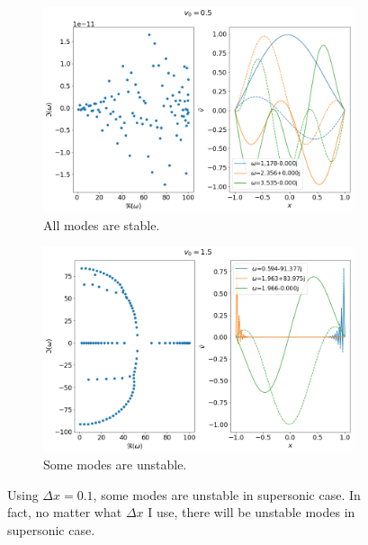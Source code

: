 \documentclass{article}
\begin{document}
\begin{figure}[H]
    \centering
    \begin{subfigure}[b]{0.45\linewidth}
        \includegraphics[width=\linewidth]{img/results-fd-N=101,v0=0.5.png}
        \caption{All modes are stable.}
    \end{subfigure}%
    \begin{subfigure}[b]{0.45\linewidth}
        \includegraphics[width=\linewidth]{img/results-fd-N=101,v0=1.5.png}
        \caption{Some modes are unstable.}
    \end{subfigure}
    \caption{Using $\Delta x=0.1$, some modes are unstable in supersonic case. In fact, no matter what $\Delta x$ I use, there will be unstable modes in supersonic case.}
    \label{fig:results-fd}
\end{figure}
\end{document}
